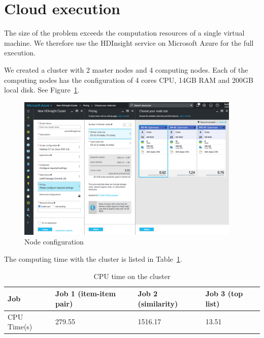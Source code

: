 \section{Cloud execution}
The size of the problem exceeds the computation resources of a single
virtual machine. We therefore use the HDInsight service on Microsoft
Azure for the full execution.

We created a cluster with 2 master nodes and 4 computing nodes. Each of
the computing nodes has the configuration of 4 cores CPU, 14GB RAM and
200GB local disk. See Figure~\ref{fig:node}.
\begin{figure}[!ht]
  \centering
  \includegraphics[width=0.95\textwidth]{images/node}
  \caption{Node configuration}
  \label{fig:node}
\end{figure}

The computing time with the cluster is listed in Table~\ref{tab:clustertime}.
\begin{table}[!ht]
  \centering
  \begin{tabular}{|p{2.5cm}|p{4cm}|p{3cm}|p{3cm}|}
    \hline
    Job & Job 1 (item-item pair) & Job 2 (similarity) & Job 3 (top list)\\
    \hline
    CPU Time(s) & 279.55 & 1516.17 & 13.51\\
    \hline
  \end{tabular}
  \caption{CPU time on the cluster}
  \label{tab:clustertime}
\end{table}
